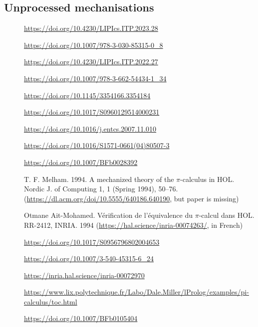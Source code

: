\subsection{Unprocessed mechanisations}
\begin{description}
\item[\cite{Tirore:2023}]                 \url{https://doi.org/10.4230/LIPIcs.ITP.2023.28}
\item[\cite{Cruz-Filipe2021}]             \url{https://doi.org/10.1007/978-3-030-85315-0_8}
\item[\cite{Pohjola2022}]                 \url{https://doi.org/10.4230/LIPIcs.ITP.2022.27}
\item[\cite{Tassarotti2017}]              \url{https://doi.org/10.1007/978-3-662-54434-1_34}
\item[\cite{Thiemann2019}]                \url{https://doi.org/10.1145/3354166.3354184}
\item[\cite{Goto2016}]                    \url{https://doi.org/10.1017/S0960129514000231}
\item[\cite{Affeldt2008}]                 \url{https://doi.org/10.1016/j.entcs.2007.11.010}
\item[\cite{Scagnetto2002}]               \url{https://doi.org/10.1016/S1571-0661(04)80507-3}
\item[\cite{Hirschkoff1997}]              \url{https://doi.org/10.1007/BFb0028392}
\item[\cite{Melham1994}]                  T. F. Melham. 1994. A mechanized theory of the $\pi$-calculus in HOL. Nordic J. of Computing 1, 1 (Spring 1994), 50–76. (\url{https://dl.acm.org/doi/10.5555/640186.640190}, but paper is missing)
\item[\cite{Ait-Mohamed1994}]             Otmane Ait-Mohamed. Vérification de l'équivalence du $\pi$-calcul dans HOL. RR-2412, INRIA. 1994 (\url{https://hal.science/inria-00074263/}, in French)
\item[\cite{Rockl2003}]                   \url{https://doi.org/10.1017/S0956796802004653}
\item[\cite{Rockl2001}]                   \url{https://doi.org/10.1007/3-540-45315-6_24}
\item[\cite{Henry-Greard1999}]            \url{https://inria.hal.science/inria-00072970}
\item[\cite{Miller2023}]                  \url{https://www.lix.polytechnique.fr/Labo/Dale.Miller/lProlog/examples/pi-calculus/toc.html}
\item[\cite{Gordon1996}]                  \url{https://doi.org/10.1007/BFb0105404}

\end{description}
